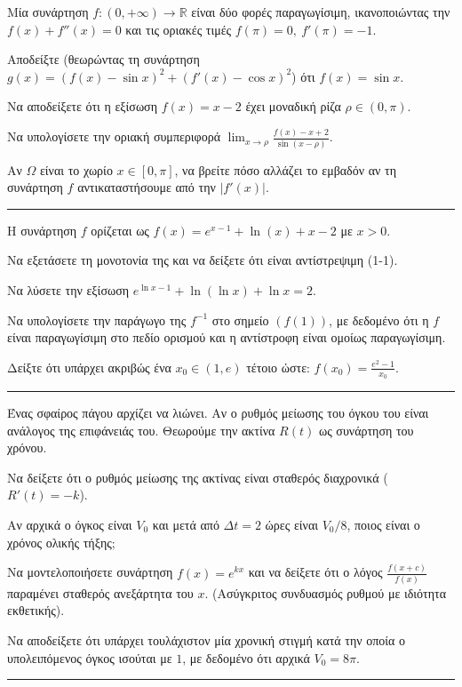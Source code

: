 \documentclass[11pt,a4paper]{article}
\newcommand{\kerkissans}[1]{{\fontfamily{maksf}\selectfont \textbf{#1}}}
\newcounter{themaD}
\newcommand{\ThemaD}{\refstepcounter{themaD}{\textbf{\textcolor{red!80!black}{\faPenSquare\ \ \large \kerkissans{\textbf{Απαιτητικό Θέμα Δ\arabic{themaD}}}}}}\hspace{2mm}}
\newenvironment{themaDbox}
{\begin{tcolorbox}[title=\ThemaD,breakable,
enhanced standard,titlerule=0pt,toprule=0pt, rightrule=0pt, bottomrule=0pt,
colback=white,left=0mm,top=1mm,bottom=0mm,
boxrule=0pt,
colframe=white,leftrule=0mm,sharp corners,coltitle=black]}
{\end{tcolorbox}\vspace{0.7cm}\hrule\vspace{0.7cm}}
\begin{document}
\begin{themaDbox}
Μία συνάρτηση $f:(0, +\infty) \to \mathbb{R}$ είναι δύο φορές παραγωγίσιμη, ικανοποιώντας την $f(x) + f''(x) = 0$ και τις οριακές τιμές $f(\pi) = 0, \ f'(\pi) = -1$.
\begin{erwthma}
    \item Αποδείξτε (θεωρώντας τη συνάρτηση $g(x) = (f(x) - \sin x)^2 + (f'(x) - \cos x)^2$) ότι $f(x) = \sin x$.
    \item Να αποδείξετε ότι η εξίσωση $f(x) = x - 2$ έχει μοναδική ρίζα $\rho \in (0, \pi)$.
    \item Να υπολογίσετε την οριακή συμπεριφορά $\displaystyle\lim_{x\to \rho} \frac{f(x) - x + 2}{\sin(x - \rho)}$.
    \item Αν $\Omega$ είναι το χωρίο $x \in [0, \pi]$, να βρείτε πόσο αλλάζει το εμβαδόν αν τη συνάρτηση $f$ αντικαταστήσουμε από την $\left|f'(x)\right|$.
\end{erwthma}
\end{themaDbox}

\begin{themaDbox}
Η συνάρτηση $f$ ορίζεται ως $f(x) = e^{x-1} + \ln(x) + x - 2$ με $x>0$.
\begin{erwthma}
    \item Να εξετάσετε τη μονοτονία της και να δείξετε ότι είναι αντίστρεψιμη (1-1). 
    \item Να λύσετε την εξίσωση $e^{\ln x - 1} + \ln(\ln x) + \ln x = 2$.
    \item Να υπολογίσετε την παράγωγο της $f^{-1}$ στο σημείο $(f(1))$, με δεδομένο ότι η $f$ είναι παραγωγίσιμη στο πεδίο ορισμού και η αντίστροφη είναι ομοίως παραγωγίσιμη.
    \item Δείξτε ότι υπάρχει ακριβώς ένα $x_0 \in (1, e)$ τέτοιο ώστε: $f(x_0) = \frac{e^2 - 1}{x_0}$.
\end{erwthma}
\end{themaDbox}

\begin{themaDbox}
Ένας σφαίρος πάγου αρχίζει να λιώνει. Αν ο ρυθμός μείωσης του όγκου του είναι ανάλογος της επιφάνειάς του. Θεωρούμε την ακτίνα $R(t)$ ως συνάρτηση του χρόνου.
\begin{erwthma}
    \item Να δείξετε ότι ο ρυθμός μείωσης της ακτίνας είναι σταθερός διαχρονικά ($R'(t) = -k$).
    \item Αν αρχικά ο όγκος είναι $V_0$ και μετά από $\Delta t = 2$ ώρες είναι $V_0 / 8$, ποιος είναι ο χρόνος ολικής τήξης;
    \item Να μοντελοποιήσετε συνάρτηση $f(x) = e^{k x}$ και να δείξετε ότι ο λόγος $\frac{f(x+c)}{f(x)}$ παραμένει σταθερός ανεξάρτητα του $x$. (Ασύγκριτος συνδυασμός ρυθμού με ιδιότητα εκθετικής).
    \item Να αποδείξετε ότι υπάρχει τουλάχιστον μία χρονική στιγμή κατά την οποία ο υπολειπόμενος όγκος ισούται με $1$, με δεδομένο ότι αρχικά $V_0 = 8\pi$.
\end{erwthma}
\end{themaDbox}
\end{document}
